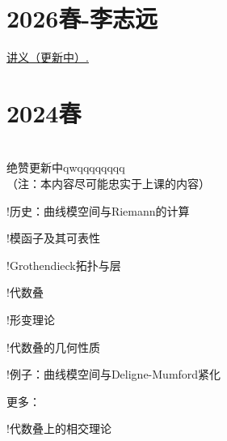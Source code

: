 \section{2026春-李志远}
\href{http://ridongen031110.github.io/ridongen.github.io/files/2026_Spring_Moduli_Space.pdf}{讲义（更新中）.}

\section{2024春}

\begin{center}
     \\ 绝赞更新中qwqqqqqqqq 
    \\ （注：本内容尽可能忠实于上课的内容）

\end{center}

\begin{structure}

    \subpage!{历史：曲线模空间与Riemann的计算}

    \subpage!{模函子及其可表性}

    \subpage!{Grothendieck拓扑与层}

    \subpage!{代数叠}

    \subpage!{形变理论}

    \subpage!{代数叠的几何性质}

    \subpage!{例子：曲线模空间与Deligne-Mumford紧化}

    更多：

    \subpage!{代数叠上的相交理论}

\end{structure}